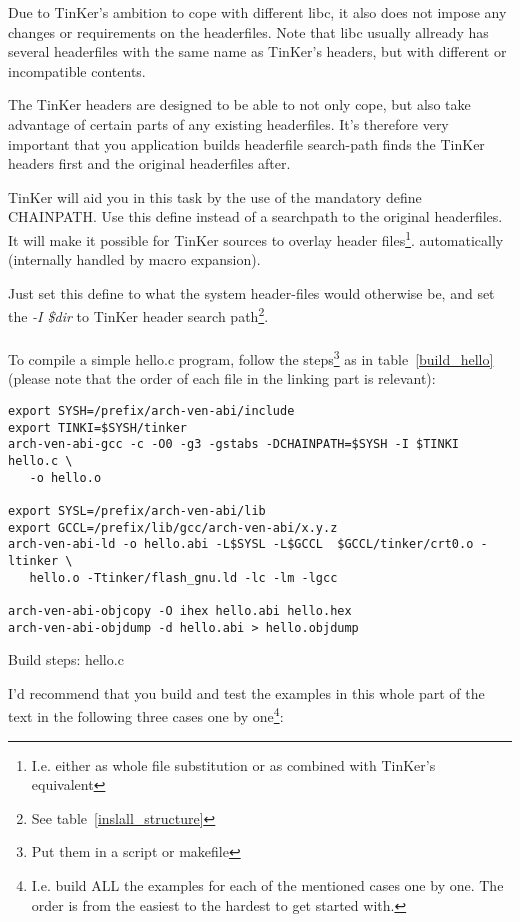 Due to TinKer's ambition to cope with different libc, it also does not impose any changes or requirements on the headerfiles. Note that libc usually allready has several headerfiles with the same name as TinKer's headers, but with different or incompatible contents.

The TinKer headers are designed to be able to not only cope, but also take advantage of certain parts of any existing headerfiles. It's therefore very important that you application builds headerfile search-path finds the TinKer headers first and the original headerfiles after.

TinKer will aid you in this task by the use of the mandatory define CHAINPATH. Use this define instead of a searchpath to the original headerfiles. It will make it possible for TinKer sources to overlay header files\footnote{I.e. either as whole file substitution or as combined with TinKer's equivalent}. automatically (internally handled by macro expansion).

Just set this define to what the system header-files would otherwise be, and set the \textit{-I \$dir} to TinKer header search path\footnote{See table~\ref{inslall_structure}}.
\\\\
To compile a simple hello.c program, follow the steps\footnote{Put them in a script or makefile} as in table~\ref{build_hello} (please note that the order of each file in the linking part is relevant):
\begin{table}[!hbp]
\begin{verbatim}
export SYSH=/prefix/arch-ven-abi/include
export TINKI=$SYSH/tinker
arch-ven-abi-gcc -c -O0 -g3 -gstabs -DCHAINPATH=$SYSH -I $TINKI hello.c \
   -o hello.o

export SYSL=/prefix/arch-ven-abi/lib
export GCCL=/prefix/lib/gcc/arch-ven-abi/x.y.z
arch-ven-abi-ld -o hello.abi -L$SYSL -L$GCCL  $GCCL/tinker/crt0.o -ltinker \
   hello.o -Ttinker/flash_gnu.ld -lc -lm -lgcc

arch-ven-abi-objcopy -O ihex hello.abi hello.hex
arch-ven-abi-objdump -d hello.abi > hello.objdump
\end{verbatim}
\caption{Build steps: hello.c}\label{build_hello}
\end{table}

I'd recommend that you build and test the examples in this whole part of the text in the following three cases one by one\footnote{I.e. build ALL the examples for each of the mentioned cases one by one. The order is from the easiest to the hardest to get started with.}:

